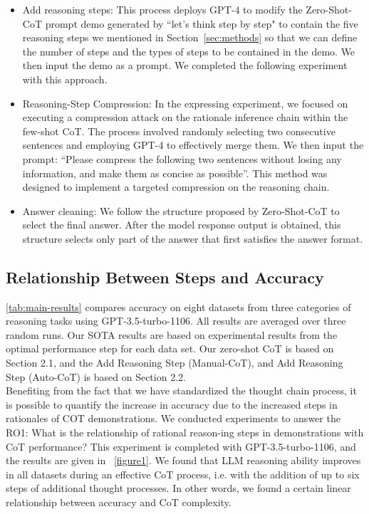 \documentclass[11pt]{article}
\begin{document}
\begin{itemize}[leftmargin=*]\setlength\itemsep{-0.3em}
\item Add reasoning steps: This process deploys GPT-4 to modify the Zero-Shot-CoT prompt demo generated by ``let's think step by step" to contain the five reasoning steps we mentioned in Section~\ref{sec:methods} so that we can define the number of steps and the types of steps to be contained in the demo. We then input the demo as a prompt. We completed the following experiment with this approach.


\item Reasoning-Step Compression: In the expressing experiment, we focused on executing a compression attack on the rationale inference chain within the few-shot CoT. The process involved randomly selecting two consecutive sentences and employing GPT-4 to effectively merge them. We then input the prompt: ``Please compress the following two sentences without losing any information, and make them as concise as possible''. This method was designed to implement a targeted compression on the reasoning chain.

\item 
Answer cleaning: We follow the structure proposed by Zero-Shot-CoT to select the final answer. After the model response output is obtained, this structure selects only part of the answer that first satisfies the answer format. 


\end{itemize}





\subsection{Relationship Between Steps and Accuracy} 
\label{section4.2}
\autoref{tab:main-results} compares accuracy on eight datasets from three categories of reasoning tasks using GPT-3.5-turbo-1106. All results are averaged over three random runs. Our SOTA results are based on experimental results from the optimal performance step for each data set. Our zero-shot CoT is based on Section 2.1, and the Add Reasoning Step (Manual-CoT), and Add Reasoning Step (Auto-CoT) is based on Section 2.2.\\


Benefiting from the fact that we have standardized the thought chain process, it is possible to quantify the increase in accuracy due to the increased steps in rationales of COT demonstrations. We conducted experiments to answer the RO1: What is the relationship of rational reason-ing steps in demonstrations with CoT performance? This experiment is completed with GPT-3.5-turbo-1106, and the results are given in ~\autoref{figure1}. We found that LLM reasoning ability improves in all datasets during an effective CoT process, i.e. with the addition of up to six steps of additional thought processes. In other words, we found a certain linear relationship between accuracy and CoT complexity.
\end{document}
